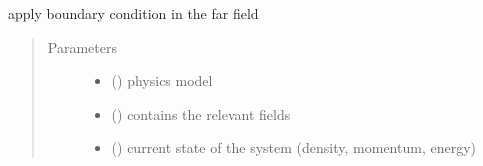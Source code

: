 \documentclass[letterpaper,10pt,english]{sphinxmanual}
\begin{document}
\begin{fulllineitems}
\begin{fulllineitems}
\begin{quote}
\begin{description}
\begin{itemize}
\end{itemize}

\end{description}\end{quote}

\end{fulllineitems}


\begin{fulllineitems}
\label{\detokenize{autoapi/NS_Airfoil/index:NS_Airfoil.NS_Airfoil.bc_far}}
\sphinxAtStartPar
apply boundary condition in the far field
\begin{quote}\begin{description}
\item[{Parameters}] \leavevmode\begin{itemize}
\item {} 
\sphinxAtStartPar
{} ({\hyperref[\detokenize{autoapi/NavierStokes/index:NavierStokes.NavierStokes}]{}}) \textendash{} physics model

\item {} 
\sphinxAtStartPar
{} ({\hyperref[\detokenize{autoapi/Workspace/index:Workspace.Workspace}]{}}) \textendash{} contains the relevant fields

\item {} 
\sphinxAtStartPar
{} ({\hyperref[\detokenize{autoapi/Field/index:Field.Field}]{}}) \textendash{} current state of the system (density, momentum, energy)

\end{itemize}

\end{description}\end{quote}

\end{fulllineitems}



\end{fulllineitems}
\end{document}
